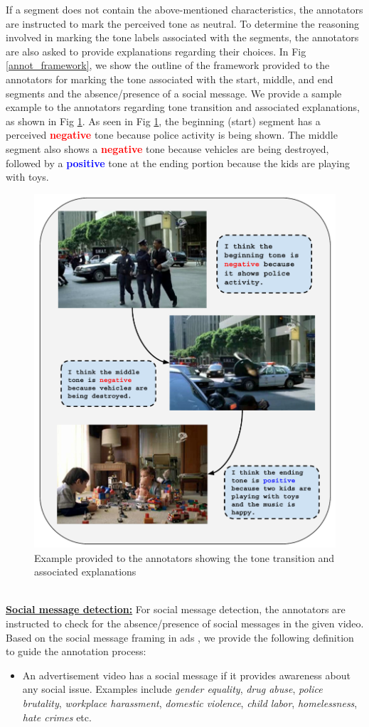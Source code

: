 If a segment does not contain the above-mentioned characteristics, the annotators are instructed to mark the perceived tone as neutral. To determine the reasoning involved in marking the tone labels associated with the segments, the annotators are also asked to provide explanations regarding their choices. In Fig \ref{annot_framework}, we show the outline of the framework provided to the annotators for marking the tone associated with the start, middle, and end segments and the absence/presence of a social message. We provide a sample example to the annotators regarding tone transition and associated explanations, as shown in Fig \ref{tone_transition}. As seen in Fig \ref{tone_transition}, the beginning (start) segment has a perceived \textcolor{red}{\textbf{negative}} tone because police activity is being shown. The middle segment also shows a \textcolor{red}{\textbf{negative}} tone because vehicles are being destroyed, followed by a \textcolor{blue}{\textbf{positive}} tone at the ending portion because the kids are playing with toys.
\begin{figure}[h!]
    \centering
    \includegraphics[width=0.5\columnwidth]{figures/Annotation_examples_tone_transition_new.pdf}
    \caption{Example provided to the annotators showing the tone transition and associated explanations}
    \label{tone_transition}
\end{figure}
\\
\textbf{\underline{Social message detection:}} For social message detection, the annotators are instructed to check for the absence/presence of social messages in the given video. Based on the social message framing in ads \cite{Brooks2020ExploringAO}, we provide the following definition to guide the annotation process:
\begin{itemize}
    \item An advertisement video has a social message if it provides awareness about any social issue. Examples include \textit{gender equality}, \textit{drug abuse}, \textit{police brutality}, \textit{workplace harassment}, \textit{domestic violence}, \textit{child labor}, \textit{homelessness}, \textit{hate crimes} etc.
\end{itemize}
